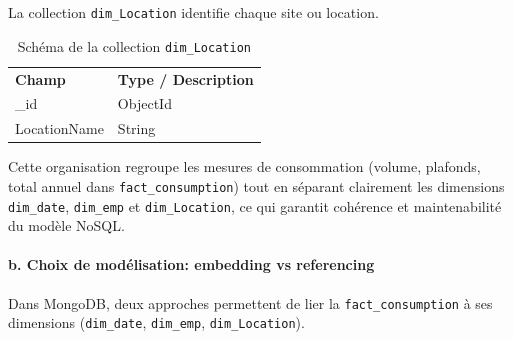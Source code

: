 \documentclass[a4paper,11pt]{report}
\begin{document}
\newpage
\vspace{1em}
La collection \texttt{dim\_Location} identifie chaque site ou location.

\begin{table}[h!]
  \centering
  \renewcommand{\arraystretch}{1.2}
  \begin{tabular}{|l|l|}
    \hline
    \rowcolor{gray!20}
    \multicolumn{2}{|c|}{\textbf{Collection : dim\_Location}}                 \\ \hline
    \textbf{Champ}         & \textbf{Type / Description}                                \\ \hline
    \_id                   & ObjectId                                                    \\ \hline
    LocationName               & String                                                      \\ \hline
  \end{tabular}
  \caption{Schéma de la collection \texttt{dim\_Location}}
\end{table}
Cette organisation regroupe les mesures de consommation (volume, plafonds, total annuel dans \texttt{fact\_consumption}) tout en séparant clairement les dimensions \texttt{dim\_date}, \texttt{dim\_emp} et \texttt{dim\_Location}, ce qui garantit cohérence et maintenabilité du modèle NoSQL.
\vspace{0.5em}
\paragraph{b. Choix de modélisation: embedding vs referencing\\}  
Dans MongoDB, deux approches permettent de lier la \texttt{fact\_consumption} à ses dimensions (\texttt{dim\_date}, \texttt{dim\_emp}, \texttt{dim\_Location}).
\end{document}
